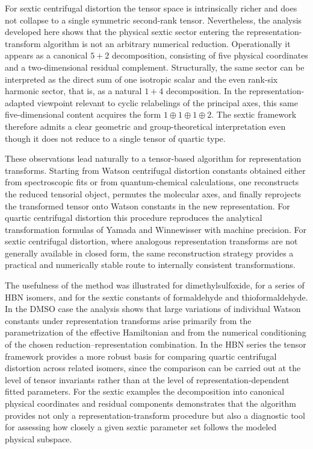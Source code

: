 For sextic centrifugal distortion the tensor space is intrinsically
richer and does not collapse to a single symmetric second-rank tensor.
Nevertheless, the analysis developed here shows that the physical
sextic sector entering the representation-transform algorithm is not
an arbitrary numerical reduction. Operationally it appears as a
canonical $5+2$ decomposition, consisting of five physical
coordinates and a two-dimensional residual complement. Structurally,
the same sector can be interpreted as the direct sum of one isotropic
scalar and the even rank-six harmonic sector, that is, as a natural
$1+4$ decomposition. In the representation-adapted viewpoint relevant
to cyclic relabelings of the principal axes, this same
five-dimensional content acquires the form $1\oplus1\oplus1\oplus2$.
The sextic framework therefore admits a clear geometric and
group-theoretical interpretation even though it does not reduce to a
single tensor of quartic type.

These observations lead naturally to a tensor-based algorithm for
representation transforms. Starting from Watson centrifugal distortion
constants obtained either from spectroscopic fits or from
quantum-chemical calculations, one reconstructs the reduced tensorial
object, permutes the molecular axes, and finally reprojects the
transformed tensor onto Watson constants in the new representation.
For quartic centrifugal distortion this procedure reproduces the
analytical transformation formulas of Yamada and Winnewisser with
machine precision. For sextic centrifugal distortion, where analogous
representation transforms are not generally available in closed form,
the same reconstruction strategy provides a practical and numerically
stable route to internally consistent transformations.

The usefulness of the method was illustrated for dimethylsulfoxide,
for a series of HBN isomers, and for the sextic constants of
formaldehyde and thioformaldehyde. In the DMSO case the analysis shows
that large variations of individual Watson constants under
representation transforms arise primarily from the parametrization of
the effective Hamiltonian and from the numerical conditioning of the
chosen reduction--representation combination. In the HBN series the
tensor framework provides a more robust basis for comparing quartic
centrifugal distortion across related isomers, since the comparison
can be carried out at the level of tensor invariants rather than at
the level of representation-dependent fitted parameters. For the
sextic examples the decomposition into canonical physical coordinates
and residual components demonstrates that the algorithm provides not
only a representation-transform procedure but also a diagnostic tool
for assessing how closely a given sextic parameter set follows the
modeled physical subspace.

